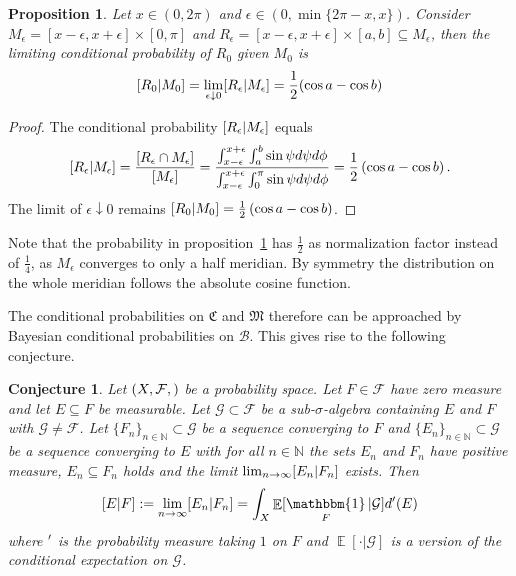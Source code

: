 \documentclass[twoside,a4paper]{report}
\theoremstyle{plain}
\newtheorem{proposition}[theorem]{Proposition}
\newtheorem{conjecture}[theorem]{Conjecture}
\theoremstyle{definition}
\theoremstyle{remark}
\numberwithin{equation}{chapter}
\newcommand{\N}{\mathbb{N}}
\let\P\relax
\DeclareMathOperator{\P}{\mathbb{P}}
\DeclareMathOperator{\E}{\mathbb{E}}
\DeclareMathOperator{\1}{\mathbbm{1}}
\newcommand{\F}{\mathcal{F}}
\renewcommand{\G}{\mathcal{G}}
\newcommand{\B}{\mathcal{B}}
\begin{document}
\begin{proposition}\label{prop:BorelMerBayes}
Let $x\in(0,2\pi)$ and $\epsilon\in(0,\min\{2\pi-x,x\})$. Consider $M_\epsilon=[x-\epsilon,x+\epsilon]\times[0,\pi]$ and $R_\epsilon=[x-\epsilon,x+\epsilon]\times[a,b]\subseteq M_\epsilon$, then the limiting conditional probability of $R_0$ given $M_0$ is
\begin{equation}
\P[R_0|M_0]=\lim_{\epsilon\downarrow0}\P[R_\epsilon|M_\epsilon]=\frac{1}{2}(\cos a-\cos b)
\end{equation}
\end{proposition}
\begin{proof}
The conditional probability $\P[R_\epsilon|M_\epsilon]$ equals
\begin{equation}
\P[R_\epsilon|M_\epsilon]=\frac{\P[R_\epsilon\cap M_\epsilon]}{\P[M_\epsilon]}=\frac{\int_{x-\epsilon}^{x+\epsilon}\int_a^b\sin\psi d\psi d\phi}{\int_{x-\epsilon}^{x+\epsilon}\int_0^{\pi}\sin\psi d\psi d\phi}=\frac{1}{2}\left(\cos a-\cos b\right).
\end{equation}
The limit of $\epsilon\downarrow0$ remains $\P[R_0|M_0]=\frac{1}{2}\left(\cos a-\cos b\right)$.
\end{proof}

Note that the probability in proposition~\ref{prop:BorelMerBayes} has $\frac{1}{2}$ as normalization factor instead of $\frac{1}{4}$, as $M_\epsilon$ converges to only a half meridian. By symmetry the distribution on the whole meridian follows the absolute cosine function.

The conditional probabilities on $\mathfrak{C}$ and $\mathfrak{M}$ therefore can be approached by Bayesian conditional probabilities on $\B$. This gives rise to the following conjecture.
\begin{conjecture}\label{con:BorelConjecture}
Let $(X,\F,\P)$ be a probability space. Let $F\in\mathcal{F}$ have zero measure and let $E\subseteq F$ be measurable. Let $\G\subset\F$ be a sub-$\sigma$-algebra containing $E$ and $F$ with $\G\neq\F$. Let $\{F_n\}_{n\in\N}\subset\G$ be a sequence converging to $F$ and $\{E_n\}_{n\in\N}\subset\G$ be a sequence converging to $E$ with for all $n\in\N$ the sets $E_n$ and $F_n$ have positive measure, $E_n\subseteq F_n$ holds and the limit $\lim_{n\to\infty}\P[E_n|F_n]$ exists. Then
\begin{equation}
\P[E|F]:=\lim_{n\to\infty}\P[E_n|F_n]=\int_X\E[\1_F|\mathcal{G}]d\P'(E)
\end{equation}
where $\P'$ is the probability measure taking $1$ on $F$ and $\E[\cdot|\G]$ is a version of the conditional expectation on $\G$.
\end{conjecture}
\end{document}

